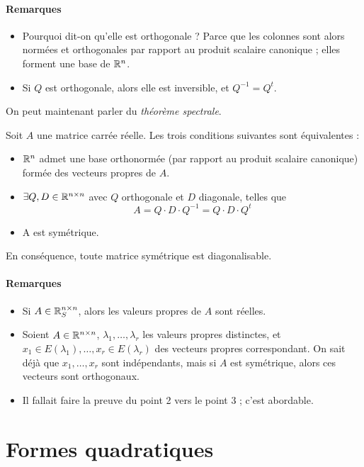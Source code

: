 \paragraph{Remarques}
\begin{itemize}
\item Pourquoi dit-on qu'elle est orthogonale ? Parce que les colonnes sont alors normées et orthogonales par rapport au produit scalaire canonique ; elles forment une base de $\mathbb{R}^n$.
\item Si $Q$ est orthogonale, alors elle est inversible, et $Q^{-1} = Q^t$.
\end{itemize}

On peut maintenant parler du \emph{théorème spectrale}.

\begin{thm}
Soit $A$ une matrice carrée réelle. Les trois conditions suivantes sont équivalentes :
\begin{itemize}
\item $\mathbb{R}^n$ admet une base orthonormée (par rapport au produit scalaire canonique) formée des vecteurs propres de $A$.
\item $\exists Q, D \in \mathbb{R}^{n \times n}$ avec $Q$ orthogonale et $D$ diagonale, telles que
\[ A = Q \cdot D \cdot Q^{-1} = Q \cdot D \cdot Q^t \]
\item A est symétrique.
\end{itemize}
\end{thm}

En conséquence, toute matrice symétrique est diagonalisable.

\paragraph{Remarques}
\begin{itemize}
\item Si $A \in \mathbb{R}^{n \times n}_S$, alors les valeurs propres de $A$ sont réelles.
\item Soient $A \in \mathbb{R}^{n \times n}$, $\lambda_1, \ldots, \lambda_r$ les valeurs propres distinctes, et $x_1 \in E(\lambda_1), \ldots, x_r \in E(\lambda_r)$ des vecteurs propres correspondant. On sait déjà que $x_1,\ldots,x_r$ sont indépendants, mais si $A$ est symétrique, alors ces vecteurs sont orthogonaux.
\item Il fallait faire la preuve du point 2 vers le point 3 ; c'est abordable.
\end{itemize}

\section{Formes quadratiques}

